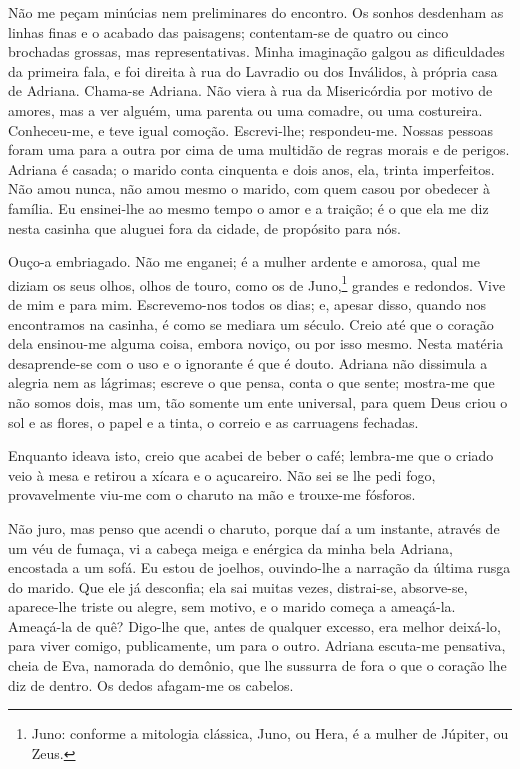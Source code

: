 Não me peçam minúcias nem preliminares do encontro. Os sonhos desdenham
as linhas finas e o acabado das paisagens; contentam-se de quatro ou
cinco brochadas grossas, mas representativas. Minha imaginação galgou as
dificuldades da primeira fala, e foi direita à rua do Lavradio ou dos
Inválidos, à própria casa de Adriana. Chama-se Adriana. Não viera à rua
da Misericórdia por motivo de amores, mas a ver alguém, uma parenta ou
uma comadre, ou uma costureira. Conheceu-me, e teve igual comoção.
Escrevi-lhe; respondeu-me. Nossas pessoas foram uma para a outra por
cima de uma multidão de regras morais e de perigos. Adriana é casada; o
marido conta cinquenta e dois anos, ela, trinta imperfeitos. Não amou
nunca, não amou mesmo o marido, com quem casou por obedecer à família.
Eu ensinei-lhe ao mesmo tempo o amor e a traição; é o que ela me diz
nesta casinha que aluguei fora da cidade, de propósito para nós.

Ouço-a embriagado. Não me enganei; é a mulher ardente e amorosa, qual me
diziam os seus olhos, olhos de touro, como os de Juno,\footnote{Juno:
  conforme a mitologia clássica, Juno, ou Hera, é a mulher de Júpiter,
  ou Zeus.} grandes e redondos. Vive de mim e para mim. Escrevemo-nos
todos os dias; e, apesar disso, quando nos encontramos na casinha, é
como se mediara um século. Creio até que o coração dela ensinou-me
alguma coisa, embora noviço, ou por isso mesmo. Nesta matéria
desaprende-se com o uso e o ignorante é que é douto. Adriana não
dissimula a alegria nem as lágrimas; escreve o que pensa, conta o que
sente; mostra-me que não somos dois, mas um, tão somente um ente
universal, para quem Deus criou o sol e as flores, o papel e a tinta, o
correio e as carruagens fechadas.

Enquanto ideava isto, creio que acabei de beber o café; lembra-me que o
criado veio à mesa e retirou a xícara e o açucareiro. Não sei se lhe
pedi fogo, provavelmente viu-me com o charuto na mão e trouxe-me
fósforos.

Não juro, mas penso que acendi o charuto, porque daí a um instante,
através de um véu de fumaça, vi a cabeça meiga e enérgica da minha bela
Adriana, encostada a um sofá. Eu estou de joelhos, ouvindo-lhe a
narração da última rusga do marido. Que ele já desconfia; ela sai muitas
vezes, distrai-se, absorve-se, aparece-lhe triste ou alegre, sem motivo,
e o marido começa a ameaçá-la. Ameaçá-la de quê? Digo-lhe que, antes de
qualquer excesso, era melhor deixá-lo, para viver comigo, publicamente,
um para o outro. Adriana escuta-me pensativa, cheia de Eva, namorada do
demônio, que lhe sussurra de fora o que o coração lhe diz de dentro. Os
dedos afagam-me os cabelos.

